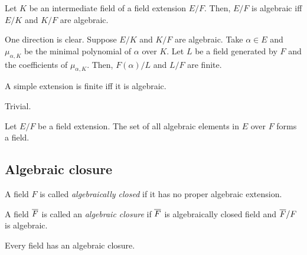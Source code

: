 \documentclass{../exp}
\begin{document}
\begin{thm}
Let $K$ be an intermediate field of a field extension $E/F$.
Then, $E/F$ is algebraic iff $E/K$ and $K/F$ are algebraic.
\end{thm}
\begin{pf}
One direction is clear.
Suppose $E/K$ and $K/F$ are algebraic.
Take $\alpha\in E$ and $\mu_{\alpha,K}$ be the minimal polynomial of $\alpha$ over $K$.
Let $L$ be a field generated by $F$ and the coefficients of $\mu_{\alpha,K}$.
Then, $F(\alpha)/L$ and $L/F$ are finite.
\end{pf}

\begin{prop}
A simple extension is finite iff it is algebraic.
\end{prop}
\begin{pf} Trivial. \end{pf}


\begin{thm}
Let $E/F$ be a field extension.
The set of all algebraic elements in $E$ over $F$ forms a field.
\end{thm}
\begin{pf}
\end{pf}




\subsection{Algebraic closure}





\begin{defn}
A field $F$ is called \emph{algebraically closed} if it has no proper algebraic extension.
\end{defn}

\begin{defn}
A field $\overline F$ is called an \emph{algebraic closure} if $\overline F$ is algebraically closed field and $\overline F/F$ is algebraic.
\end{defn}

\begin{thm}
Every field has an algebraic closure.
\end{thm}
\begin{pf}
\end{pf}
\end{document}
